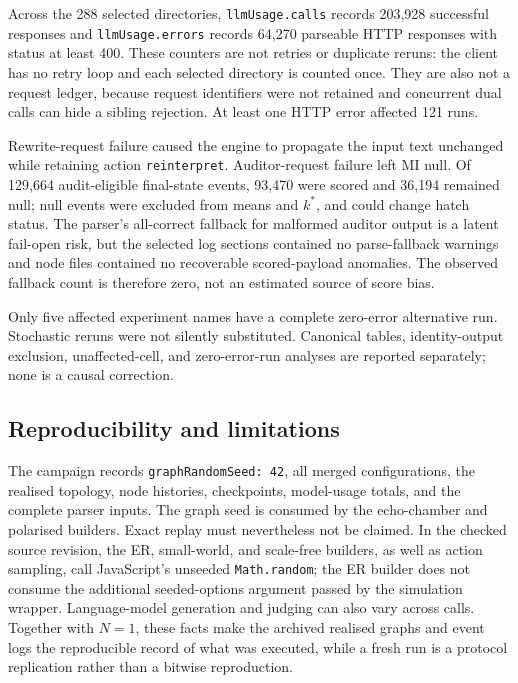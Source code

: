 Across the 288 selected directories, \texttt{llmUsage.calls} records 203,928
successful responses and \texttt{llmUsage.errors} records 64,270 parseable
HTTP responses with status at least 400. These counters are not retries or
duplicate reruns: the client has no retry loop and each selected directory is
counted once. They are also not a request ledger, because request identifiers
were not retained and concurrent dual calls can hide a sibling rejection.
At least one HTTP error affected 121 runs.

Rewrite-request failure caused the engine to propagate the input text
unchanged while retaining action \texttt{reinterpret}. Auditor-request failure
left MI null. Of 129,664 audit-eligible final-state events, 93,470 were scored
and 36,194 remained null; null events were excluded from means and
\(k^{*}\), and could change hatch status. The parser's all-correct fallback
for malformed auditor output is a latent fail-open risk, but the selected log
sections contained no parse-fallback warnings and node files contained no
recoverable scored-payload anomalies. The observed fallback count is therefore
zero, not an estimated source of score bias.

Only five affected experiment names have a complete zero-error alternative
run. Stochastic reruns were not silently substituted. Canonical tables,
identity-output exclusion, unaffected-cell, and zero-error-run analyses are
reported separately; none is a causal correction.

\subsection{Reproducibility and limitations}
\label{subsec:simulation-reproducibility}

The campaign records \texttt{graphRandomSeed: 42}, all merged configurations,
the realised topology, node histories, checkpoints, model-usage totals, and
the complete parser inputs.  The graph seed is consumed by the echo-chamber
and polarised builders.  Exact replay must nevertheless not be claimed.  In
the checked source revision, the ER, small-world, and scale-free builders, as
well as action sampling, call JavaScript's unseeded \texttt{Math.random};
the ER builder does not consume the additional seeded-options argument passed
by the simulation wrapper.  Language-model generation and judging can also
vary across calls.  Together with \(N=1\), these facts make the archived
realised graphs and event logs the reproducible record of what was executed,
while a fresh run is a protocol replication rather than a bitwise
reproduction.


